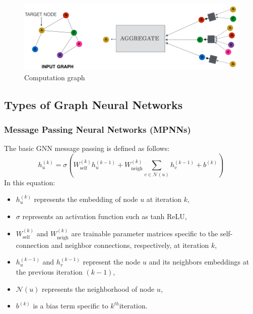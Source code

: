 \begin{figure}
    \centering
    \includegraphics[scale=0.6]{figures/computational_g.png}
    \captionsetup{font=large}
    \caption{Computation graph}
    \label{fig:comp_g}
\end{figure}




\subsection{Types of Graph Neural Networks}

 
\subsubsection{Message Passing Neural Networks (MPNNs)}
The basic GNN message passing is defined as follows:
\begin{equation}
h^{(k)}_u = \sigma\left(W^{(k)}_{\text{self}}h^{(k-1)}_u + W^{(k)}_{\text{neigh}}\sum_{v\in\mathcal{N}(u)}h^{(k-1)}_v + b^{(k)}\right)
\end{equation}
In this equation:

     \begin{itemize}
         \item $h^{(k)}_u$ represents the embedding of node  $u$ at iteration $k$,\\
         \item $\sigma$ represents an activation function such as tanh ReLU,\\
         \item $W^{(k)}_{\text{self}}$  and  $W^{(k)}_{\text{neigh}}$  are trainable parameter matrices specific to the self-connection and neighbor connections, respectively, at iteration $k$,\\
         \item $h^{(k-1)}_u$ and  $h^{(k-1)}_v$ represent the node $u$ and its neighbors embeddings at the previous iteration $(k-1)$,\\
         \item $\mathcal{N}(u)$ represents the neighborhood of node $u$,\\
         \item $b^{(k)}$ is a bias term specific to $k^{th}$iteration.
     \end{itemize}

